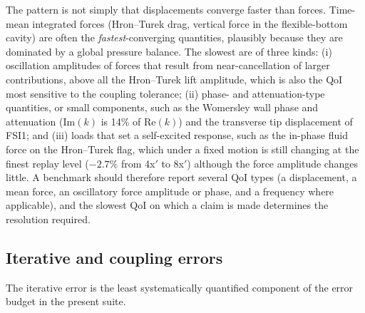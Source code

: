 The pattern is not simply that displacements converge faster than forces.
Time-mean integrated forces (Hron--Turek drag, vertical force in the flexible-bottom cavity) are often the \emph{fastest}-converging quantities, plausibly because they are dominated by a global pressure balance.
The slowest are of three kinds:
(i) oscillation amplitudes of forces that result from near-cancellation of larger contributions, above all the Hron--Turek lift amplitude, which is also the QoI most sensitive to the coupling tolerance;
(ii) phase- and attenuation-type quantities, or small components, such as the Womersley wall phase and attenuation ($\mathrm{Im}(k)$ is 14\% of $\mathrm{Re}(k)$) and the transverse tip displacement of FSI1; and
(iii) loads that set a self-excited response, such as the in-phase fluid force on the Hron--Turek flag, which under a fixed motion is still changing at the finest replay level ($-2.7\%$ from 4x$'$ to 8x$'$) although the force amplitude changes little.
A benchmark should therefore report several QoI types (a displacement, a mean force, an oscillatory force amplitude or phase, and a frequency where applicable), and the slowest QoI on which a claim is made determines the resolution required.

\subsection{Iterative and coupling errors}\label{sec:iterative_errors}

The iterative error is the least systematically quantified component of the error budget in the present suite.

